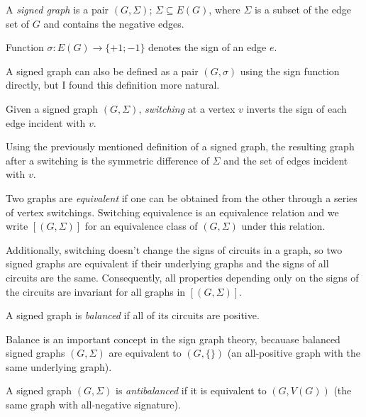 \begin{definition}
    A \textit{signed graph} is a pair $(G, \Sigma)$; $\Sigma \subseteq E(G)$, where $\Sigma$ is a subset of the edge set of $G$ and contains the negative edges.
\end{definition}

\begin{definition}
    Function $\sigma : E(G) \rightarrow \{+1; -1\}$ denotes the sign of an edge $e$.
\end{definition}

A signed graph can also be defined as a pair $(G, \sigma)$ using the sign function directly,
but I found this definition more natural.

\begin{definition}
    Given a signed graph $(G, \Sigma)$, \textit{switching} at a vertex $v$ inverts the sign of each edge
    incident with $v$. 
\end{definition}

Using the previously mentioned definition of a signed graph, the resulting graph after a switching
is the symmetric difference of $\Sigma$ and the set of edges incident with $v$.

\begin{definition}
    Two graphs are \textit{equivalent} if one can be obtained from the other through a series of vertex switchings.
    Switching equivalence is an equivalence relation and we write $[(G, \Sigma)]$ for an equivalence class of $(G, \Sigma)$ under this relation.
\end{definition}

Additionally, switching doesn't change the signs of circuits in a graph, so two signed graphs 
are equivalent if their underlying graphs and the signs of all circuits are the same. 
Consequently, all properties depending only on the signs of the circuits are invariant for all graphs in $[(G, \Sigma)]$.

\begin{definition}
    A signed graph is \textit{balanced} if all of its circuits are positive.
\end{definition}

Balance is an important concept in the sign graph theory, becauase balanced signed graphs $(G, \Sigma)$ are equivalent to $(G, \{\})$ (an all-positive graph with the same underlying graph).

\begin{definition}
    A signed graph $(G, \Sigma)$ is \textit{antibalanced} if it is equivalent to $(G, V(G))$ (the same graph with all-negative signature).
\end{definition}

